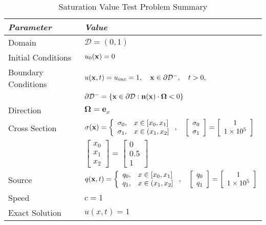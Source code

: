 \begin{table}[h]\caption{Saturation Value Test Problem Summary}
\label{tab:saturation}
\centering
\begin{tabular}{l l}\toprule
\emph{Parameter} & \emph{Value}\\\midrule
Domain & $\mathcal{D} = (0,1)$\\
Initial Conditions & $u_0(\mathbf{x})=0$\\
Boundary Conditions & $u(\mathbf{x},t)=u_{inc}=1,\quad \mathbf{x}\in\partial\mathcal{D}^-,\quad t>0,$\\
   & $\partial\mathcal{D}^-=\{\mathbf{x}\in\partial\mathcal{D}:\mathbf{n}(\mathbf{x})
     \cdot\mathbf{\Omega}<0\}$\\
Direction & $\mathbf{\Omega} = \mathbf{e}_x$\\
Cross Section & $\sigma(\mathbf{x})=\left\{\begin{array}{c l}
   \sigma_0, & x\in[x_0,x_1]\\
   \sigma_1, & x\in(x_1,x_2]
   \end{array}\right.,\quad
   \left[\begin{array}{c}\sigma_0\\\sigma_1\end{array}\right] =
      \left[\begin{array}{c}1\\1\times 10^5\end{array}\right]$\\
   & $\left[\begin{array}{c}x_0\\x_1\\x_2\end{array}\right] =
      \left[\begin{array}{c}0\\0.5\\1\end{array}\right]$\\
Source & $q(\mathbf{x},t)=\left\{\begin{array}{c l}
   q_0, & x\in[x_0,x_1]\\
   q_1, & x\in(x_1,x_2]
   \end{array}\right.,\quad
   \left[\begin{array}{c}q_0\\q_1\end{array}\right] =
      \left[\begin{array}{c}1\\1\times 10^5\end{array}\right]$\\
Speed & $c=1$\\
Exact Solution & $u(x,t) = 1$ \\
\bottomrule\end{tabular}
\end{table}
